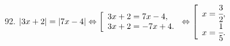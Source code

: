 92. $|3x+2|=|7x-4|\Leftrightarrow \left[\begin{array}{l} 3x+2=7x-4,\\ 3x+2=-7x+4.\end{array}\right.
\Leftrightarrow \left[\begin{array}{l} x=\cfrac{3}{2},\\ x=\cfrac{1}{5}.\end{array}\right.$\\
